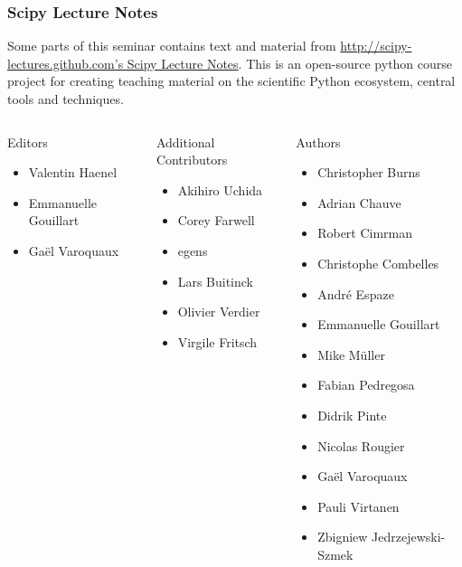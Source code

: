 \documentclass[9pt,colorlinks]{beamer}
\begin{document}
\begin{frame}[shrink]\frametitle{Scipy Lecture Notes}
    \small Some parts of this seminar contains text and material from \href{http://scipy-lectures.github.com/}{http://scipy-lectures.github.com's Scipy Lecture Notes}. This is an open-source python course project for creating teaching material on the scientific Python ecosystem, central tools and techniques.

    \Tiny
\begin{columns}[c]
\begin{block}{Editors}
\begin{itemize}
    \item Valentin Haenel
    \item Emmanuelle Gouillart
    \item  Gaël Varoquaux
\end{itemize}          
\end{block}
\begin{block}{Additional Contributors}

    \begin{itemize}  
        \item  Akihiro Uchida
        \item Corey Farwell
        \item egens
        \item Lars Buitinck
        \item  Olivier Verdier
        \item Virgile Fritsch
    \end{itemize}
\end{block}

\begin{block}{Authors}
\begin{itemize}
    \item  Christopher Burns
    \item Adrian Chauve
    \item Robert Cimrman
    \item Christophe Combelles
    \item André Espaze
    \item Emmanuelle Gouillart
    \item Mike Müller
    \item Fabian Pedregosa
    \item Didrik Pinte
    \item Nicolas Rougier
    \item Gaël Varoquaux
    \item Pauli Virtanen
    \item Zbigniew Jedrzejewski-Szmek
\end{itemize}
\end{block}
\end{columns}

\end{frame}
\end{document}
